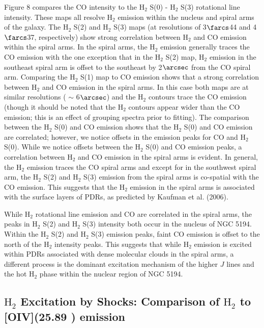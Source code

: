 \documentclass[manuscript]{aastex}
\begin{document}
Figure 8 compares the CO intensity to the $\mathrm{H_2}$ S(0) - $\mathrm{H_2}$ S(3) rotational line intensity.  These maps all resolve $\mathrm{H_2}$ emission within the nucleus and spiral arms of the galaxy.  The $\mathrm{H_2}$ S(2) and $\mathrm{H_2}$ S(3) maps (at resolutions of  3$\farcs$44 and 4$\farcs$37, respectively) show strong correlation between $\mathrm{H_2}$ and CO emission within the spiral arms.   In the spiral arms, the $\mathrm{H_2}$ emission generally traces the CO emission with the one exception that in the $\mathrm{H_2}$ S(2) map, $\mathrm{H_2}$ emission in the southeast spiral arm is offset to the southeast by 2$\arcsec$ from the CO spiral arm.  Comparing the $\mathrm{H_2}$ S(1) map to CO emission shows that a strong correlation between $\mathrm{H_2}$ and CO  emission in the spiral arms.  In this case both maps are at similar resolutions ( $\sim$ 6$\arcsec$) and the $\mathrm{H_2}$ contours trace the CO emission (though it should be noted that the $\mathrm{H_2}$ contours appear wider than the CO emission; this is an effect of grouping spectra prior to fitting).  The comparison between the $\mathrm{H_2}$ S(0) and CO emission shows that the $\mathrm{H_2}$ S(0) and CO emission are correlated; however, we notice offsets in the emission peaks for CO and $\mathrm{H_2}$ S(0).  While we notice offsets between the $\mathrm{H_2}$ S(0) and CO emission peaks, a correlation between $\mathrm{H_2}$ and CO emission in the spiral arms is evident.  In general, the $\mathrm{H_2}$ emission traces the CO spiral arms and except for in the southwest spiral arm, the $\mathrm{H_2}$ S(2) and $\mathrm{H_2}$ S(3) emission from the spiral arms is co-spatial with the CO emission.  This suggests that the $\mathrm{H_2}$ emission in the spiral arms is associated with the surface layers of PDRs, as predicted by Kaufman et al. (2006).

While $\mathrm{H_2}$ rotational line emission and CO are correlated in the spiral arms, the peaks in $\mathrm{H_2}$ S(2) and $\mathrm{H_2}$ S(3) intensity both occur in the nucleus of NGC 5194.  Within the $\mathrm{H_2}$ S(2) and $\mathrm{H_2}$ S(3) emission peaks, faint CO emission is offset to the north of the $\mathrm{H_2}$ intensity peaks.  This suggests that while $\mathrm{H_2}$ emission is excited within PDRs associated with dense molecular clouds in the spiral arms, a different process is the dominant excitation mechanism of the higher $J$ lines and the hot $\mathrm{H_2}$ phase within the nuclear region of NGC 5194.

\subsection{$\mathrm{H_2}$ Excitation by Shocks: Comparison of $\mathrm{H_2}$ to [OIV](25.89 \micron) emission}
\end{document}
